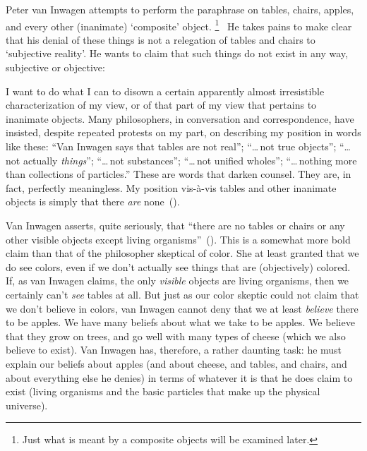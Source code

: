 \documentclass[11pt]{article}
\newenvironment{squote}{%
	\begin{spacing}{1}
	\begin{list}{}{%
	\setlength{\labelwidth}{0pt}%
	\rightmargin\leftmargin%
	}
	\item\relax
	}{%
	\end{list}%
	\end{spacing}
	}
\begin{document}
\begin{spacing}{1.5}
Peter van Inwagen attempts to perform the paraphrase on tables, chairs, apples, and every other (inanimate) `composite' object.%
%
\footnote{Just what is meant by a composite objects will be examined later.}
%
\ He takes pains to make clear that his denial of these things is not a relegation of tables and chairs to `subjective reality'. He wants to claim that such things do not exist in any way, subjective or objective:
\begin{squote}
I want to do what I can to disown a certain apparently almost irresistible characterization of my view, or of that part of my view that pertains to inanimate objects. Many philosophers, in conversation and correspondence, have insisted, despite repeated protests on my part, on describing my position in words like these: ``Van Inwagen says that tables are not real''; ``\ldots\,not true objects''; ``\ldots\,not actually {\em things}''; ``\ldots\,not substances''; ``\ldots\,not unified wholes''; ``\ldots\,nothing more than collections of particles.'' These are words that darken counsel. They are, in fact, perfectly meaningless. My position vis-\`{a}-vis tables and other inanimate objects is simply that there {\em are} none~(\citeyear[99]{inwagen1995}).
\end{squote}
Van Inwagen asserts, quite seriously, that ``there are no tables or chairs or any other visible objects except living organisms''~(\citeyear[1]{inwagen1995}). This is a somewhat more bold claim than that of the philosopher skeptical of color. She at least granted that we do see colors, even if we don't actually see things that are (objectively) colored. If, as van Inwagen claims, the only {\em visible} objects are living organisms, then we certainly can't {\em see} tables at all. But just as our color skeptic could not claim that we don't believe in colors, van Inwagen cannot deny that we at least {\em believe} there to be apples. We have many beliefs about what we take to be apples. We believe that they grow on trees, and go well with many types of cheese (which we also believe to exist). Van Inwagen has, therefore, a rather daunting task: he must explain our beliefs about apples (and about cheese, and tables, and chairs, and about everything else he denies) in terms of whatever it is that he does claim to exist (living organisms and the basic particles that make up the physical universe).
%
%


\end{spacing}
\end{document}
